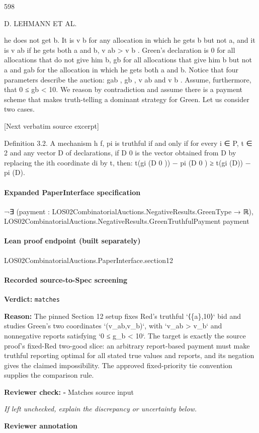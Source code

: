 \documentclass[10pt]{article}
\newcommand{\reviewerbox}{%
  \par\noindent\fbox{\parbox{0.96\linewidth}{\rule{0pt}{0.38in}}}\par
}
\newcommand{\reviewmatch}[1]{%
  \par\noindent\textbf{Reviewer check:} $\square$\; #1\par
  \noindent\emph{If left unchecked, explain the discrepancy or uncertainty below.}\par
}
\begin{document}
\begin{ReviewVerbatim}
598

D. LEHMANN ET AL.

he does not get b. It is v b for any allocation in which he gets b but not a, and it
is v ab if he gets both a and b, v ab > v b . Green’s declaration is 0 for all allocations
that do not give him b, gb for all allocations that give him b but not a and gab for
the allocation in which he gets both a and b. Notice that four parameters describe
the auction: gab , gb , v ab and v b . Assume, furthermore, that 0 ≤ gb < 10. We reason
by contradiction and assume there is a payment scheme that makes truth-telling a
dominant strategy for Green. Let us consider two cases.

[Next verbatim source excerpt]

Definition 3.2. A mechanism h f, pi is truthful if and only if for every i ∈ P,
t ∈ 2 and any vector D of declarations, if D 0 is the vector obtained from D by
replacing the ith coordinate di by t, then: t(gi (D 0 )) − pi (D 0 ) ≥ t(gi (D)) − pi (D).
\end{ReviewVerbatim}



\paragraph{Expanded PaperInterface specification}
\begin{ReviewVerbatim}
¬∃ (payment : LOS02CombinatorialAuctions.NegativeResults.GreenType → ℝ),
    LOS02CombinatorialAuctions.NegativeResults.GreenTruthfulPayment payment
\end{ReviewVerbatim}



\paragraph{Lean proof endpoint (built separately)}\begin{ReviewVerbatim}
LOS02CombinatorialAuctions.PaperInterface.section12
\end{ReviewVerbatim}

\paragraph{Recorded source-to-Spec screening}
\textbf{Verdict:} \texttt{matches}
\\
{\raggedright
\textbf{Reason:} The pinned Section 12 setup fixes Red's truthful `⟨\{a\},10⟩` bid and studies Green's two coordinates `(v\_\allowbreak{}ab,v\_\allowbreak{}b)`, with `v\_\allowbreak{}ab > v\_\allowbreak{}b` and nonnegative reports satisfying `0 ≤ g\_\allowbreak{}b < 10`.\allowbreak{} The target is exactly the source proof's fixed-\allowbreak{}Red two-\allowbreak{}good slice:\allowbreak{} an arbitrary report-\allowbreak{}based payment must make truthful reporting optimal for all stated true values and reports, and its negation gives the claimed impossibility.\allowbreak{} The approved fixed-\allowbreak{}priority tie convention supplies the comparison rule.\allowbreak{}
\par}
\reviewmatch{Matches source input}
\noindent\textbf{Reviewer annotation}\par
\reviewerbox
\end{document}
